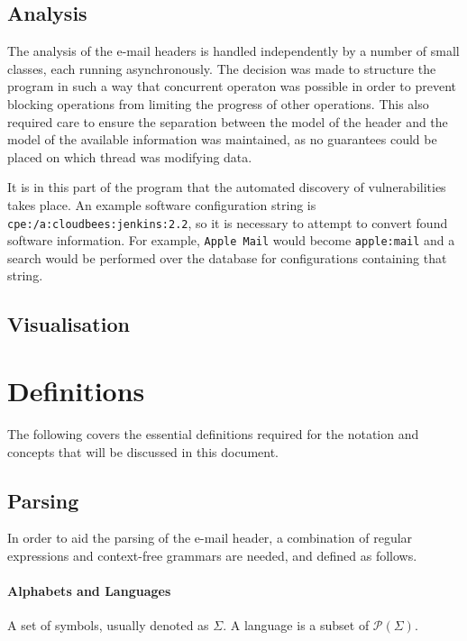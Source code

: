 \subsection{Analysis}

The analysis of the e-mail headers is handled independently by a number of small classes, each running asynchronously.  The decision was made to structure the program in such a way that concurrent operaton was possible in order to prevent blocking operations from limiting the progress of other operations. This also required care to ensure the separation between the model of the header and the model of the available information was maintained, as no guarantees could be placed on which thread was modifying data.

It is in this part of the program that the automated discovery of vulnerabilities takes place.  An example software configuration string is \texttt{cpe:/a:cloudbees:jenkins:2.2}, so it is necessary to attempt to convert found software information.  For example, \texttt{Apple Mail} would become \texttt{apple:mail} and a search would be performed over the database for configurations containing that string.


\subsection{Visualisation}

\section{Definitions}

The following covers the essential definitions required for the notation and
concepts that will be discussed in this document.

\subsection{Parsing}

In order to aid the parsing of the e-mail header, a combination of regular
expressions and context-free grammars are needed, and defined as follows.

\paragraph{Alphabets and Languages}

A set of symbols, usually denoted as $\Sigma$.  A language is a subset of
$\mathcal P (\Sigma)$.


